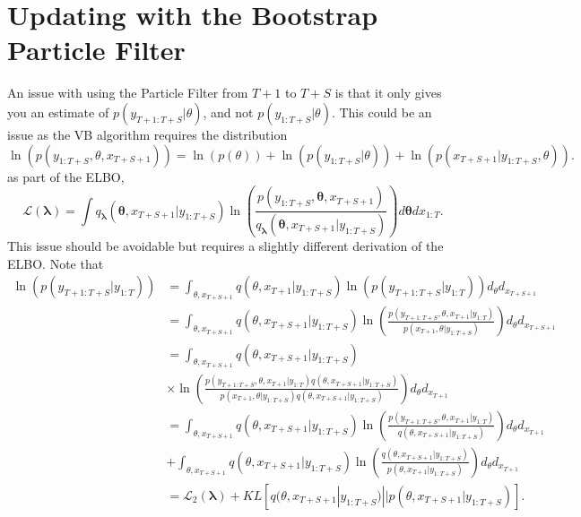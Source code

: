 \documentclass[12pt,a4paper]{article}%
\begin{document}
\section{Updating with the Bootstrap Particle Filter}

An issue with using the Particle Filter from $T+1$ to $T+S$ is that it only gives you an estimate of $p(y_{T+1:T+S} | \theta)$, and not $p(y_{1:T+S} | \theta)$. This could be an issue as the VB algorithm requires the distribution
\begin{equation}
\label{VBPF}
\ln(p(y_{1:T+S}, \theta, x_{T+S+1})) = \ln(p(\theta)) + \ln(p(y_{1:T+S} | \theta)) + \ln(p(x_{T+S+1} | y_{1:T+S}, \theta)).
\end{equation}
as part of the ELBO,
\begin{equation}
\label{ELBO}
\mathcal{L}(\boldsymbol{\lambda}) = \int q_{\boldsymbol{\lambda}}(\boldsymbol{\theta}, x_{T+S+1} | y_{1:T+S}) \ln \left( \frac{p(y_{1:T+S},\boldsymbol{\theta}, x_{T+S+1})}{q_{\boldsymbol{\lambda}}(\boldsymbol{\theta}, x_{T+S+1} | y_{1:T+S})} \right) d\boldsymbol{\theta}dx_{1:T}.
\end{equation}
This issue should be avoidable but requires a slightly different derivation of the ELBO. Note that
\begin{align}
\ln(p(y_{T+1:T+S} | y_{1:T})) &= \int_{\theta, x_{T+S+1}} q(\theta, x_{T+1} | y_{1:T+S}) \ln(p(y_{T+1:T+S} | y_{1:T})) d_{\theta} d_{x_{T+S+1}} \nonumber \\
&= \int_{\theta, x_{T+S+1}} q(\theta, x_{T+S+1}| y_{1:T+S}) \ln \left(\frac{p(y_{T+1:T+S}, \theta, x_{T+1} | y_{1:T})}{p(x_{T+1}, \theta | y_{1:T+S})} \right) d_{\theta} d_{x_{T+S+1}}\nonumber \\
&= \int_{\theta, x_{T+S+1}} q(\theta, x_{T+S+1}| y_{1:T+S}) \nonumber \\
&\times \ln \left( \frac{p(y_{T+1:T+S}, \theta, x_{T+1} | y_{1:T})q(\theta, x_{T+S+1}| y_{1:T+S})}
{p(x_{T+1}, \theta | y_{1:T+S})q(\theta, x_{T+S+1}| y_{1:T+S}) } \right) d_{\theta} d_{x_{T+1}}\nonumber \\
&= \int_{\theta, x_{T+S+1}} q(\theta, x_{T+S+1}| y_{1:T+S}) \ln \left(\frac{p(y_{T+1:T+S}, \theta, x_{T+1} | y_{1:T})}{q(\theta, x_{T+S+1}| y_{1:T+S})} \right) d_{\theta} d_{x_{T+1}} \label{ELBOv2}\\
&+  \int_{\theta, x_{T+S+1}} q(\theta, x_{T+S+1}| y_{1:T+S}) \ln \left(\frac{q(\theta, x_{T+S+1}| y_{1:T+S})}{p(\theta, x_{T+1} | y_{1:T+S})} \right) d_{\theta} d_{x_{T+1}} \label{KL} \\
&= \mathcal{L}_2(\boldsymbol{\lambda}) + KL[q(\theta, x_{T+S+1} | y_{1:T+S}) || p(\theta, x_{T+S+1} | y_{1:T+S})]. \nonumber
\end{align}
\end{document}
